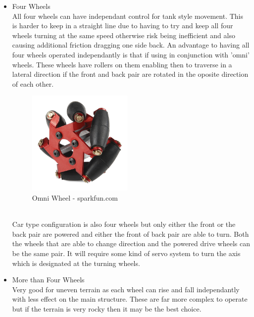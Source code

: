 \begin{itemize}
\begin{itemize}
	\item Four Wheels
	\\All four wheels can have independant control for tank style movement.  This is harder to keep in a straight line due to having to try and keep all four wheels turning at the same speed otherwise risk being inefficient and also causing additional friction dragging one side back.  An advantage to having all four wheels operated independantly is that if using in conjunction with 'omni' wheels.  These wheels have rollers on them enabling then to traverse in a lateral direction if the front and back pair are rotated in the oposite direction of each other.
\begin{figure}[h]
\centering
        \includegraphics[width=2.0in] {Images/mechanum.jpg}
        \caption{Omni Wheel - sparkfun.com}
        \label{Omni Wheel}
\end{figure}
	\\Car type configuration is also four wheels but only either the front or the back pair are powered and either the front of back pair are able to turn.  Both the wheels that are able to change direction and the powered drive wheels can be the same pair.  It will require some kind of servo system to turn the axis which is designated at the turning wheels.

	\item More than Four Wheels
	\\Very good for uneven terrain as each wheel can rise and fall independantly with less effect on the main structure.  These are far more complex to operate but if the terrain is very rocky then it may be the best choice.
	\end{itemize}


\end{itemize}

